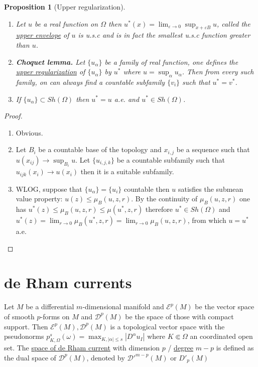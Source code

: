 \documentclass[11pt]{article}
\newtheorem{proposition}{Proposition}[theorem]
\begin{document}
\begin{proposition}[Upper regularization]
\label{prop:upper-regularization}
\begin{enumerate}
\item Let \(u\) be a real function on \(\Omega\) then \(u^*(x) = \lim_{\varepsilon\to 0}
   \sup_{x+\varepsilon B} u\), called the \uline{upper envelope} of \(u\) is u.s.c and is in
fact the smallest u.s.c function greater than \(u\).
\item \textbf{Choquet lemma.} Let \(\{u_\alpha\}\) be a family of real function, one defines the
\uline{upper regularization} of \(\{ u_\alpha\}\) by \(u^*\) where \(u=\sup_\alpha u_\alpha\). Then from every such family, on can always find a countable subfamily \(\{v_i\}\)
such that \(u^* = v^*\).
\item If \(\{u_{\alpha}\} \subset Sh(\Omega)\) then \(u^* = u\) a.e. and \(u^*\in Sh(\Omega)\).
\end{enumerate}
\end{proposition}
\begin{proof}
\begin{enumerate}
\item Obvious.
\item Let \(B_i\) be a countable base of the topology and \(x_{i,j}\) be a sequence such
that \(u(x_{ij}) \to \sup_{B_i}u\). Let \(\{ u_{i,j,k} \}\) be a countable subfamily
such that \(u_{ijk}(x_i) \to u(x_i)\) then it is a suitable subfamily.
\item WLOG, suppose that \(\{u_\alpha\} = \{u_i\}\) countable then \(u\) satisfies the
submean value property: \(u(z)\leq \mu_B(u,z,r)\). By the continuity of \(\mu_B(u,z,r)\) one has \(u^*(z)\leq \mu_B(u,z,r)\leq \mu(u^*,z,r)\) therefore \(u^*\in
   Sh(\Omega)\) and \(u^*(z) = \lim_{r\to 0} \mu_B(u^*,z,r) = \lim_{r\to 0}\mu_B(u,z,r)\), from which \(u=u^*\) a.e.
\end{enumerate}
\end{proof}


\section{de Rham currents}
\label{sec:org5130693}

Let \(M\) be a differential \(m\)-dimensional manifold and \(\mathcal{E}^p(M)\) be
the vector space of smooth \(p\)-forms on \(M\) and \(\mathcal{D}^p(M)\) be the
space of those with compact support. Then \(\mathcal{E}^p(M), \mathcal{D}^p(M)\) is a topological vector
space with the pseudonorms \(p_{K,\Omega}^s(\omega) = \max_{K, |\alpha|\leq s}|D^\alpha
  u_I|\) where \(K\Subset \Omega\) an coordinated open set. The \uline{space of de Rham
current} with dimension \(p\) / \uline{degree} \(m - p\) is defined as the dual space of
\(\mathcal{D}^p(M)\), denoted by \(\mathcal{D}'^{m-p}(M)\) or \(D'_{p}(M)\)
\end{document}
